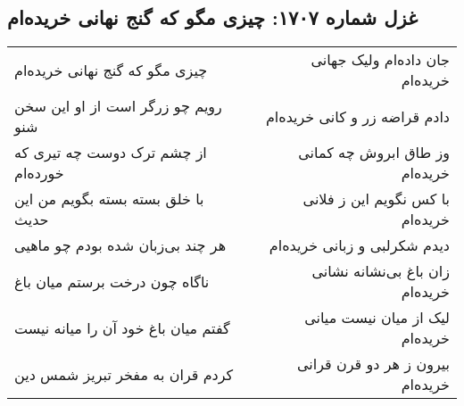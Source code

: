 \begin{center}
\section*{غزل شماره ۱۷۰۷: چیزی مگو که گنج نهانی خریده‌ام}
\label{sec:1707}
\begin{longtable}{l p{0.5cm} r}
چیزی مگو که گنج نهانی خریده‌ام
&&
جان داده‌ام ولیک جهانی خریده‌ام
\\
رویم چو زرگر است از او این سخن شنو
&&
دادم قراضه زر و کانی خریده‌ام
\\
از چشم ترک دوست چه تیری که خورده‌ام
&&
وز طاق ابروش چه کمانی خریده‌ام
\\
با خلق بسته بسته بگویم من این حدیث
&&
با کس نگویم این ز فلانی خریده‌ام
\\
هر چند بی‌زبان شده بودم چو ماهیی
&&
دیدم شکرلبی و زبانی خریده‌ام
\\
ناگاه چون درخت برستم میان باغ
&&
زان باغ بی‌نشانه نشانی خریده‌ام
\\
گفتم میان باغ خود آن را میانه نیست
&&
لیک از میان نیست میانی خریده‌ام
\\
کردم قران به مفخر تبریز شمس دین
&&
بیرون ز هر دو قرن قرانی خریده‌ام
\\
\end{longtable}
\end{center}
